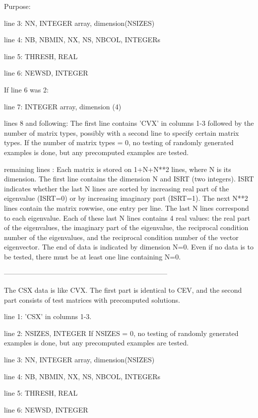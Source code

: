 \begin{DoxyParagraph}{Purpose\+: }
\begin{DoxyVerb}
 line 3:  NN, INTEGER array, dimension(NSIZES)

 line 4:  NB, NBMIN, NX, NS, NBCOL, INTEGERs

 line 5:  THRESH, REAL

 line 6:  NEWSD, INTEGER

 If line 6 was 2:

 line 7:  INTEGER array, dimension (4)

 lines 8 and following: The first line contains 'CVX' in columns 1-3
          followed by the number of matrix types, possibly with
          a second line to specify certain matrix types.
          If the number of matrix types = 0, no testing of randomly
          generated examples is done, but any precomputed examples
          are tested.

 remaining lines : Each matrix is stored on 1+N+N**2 lines, where N is
          its dimension. The first line contains the dimension N and
          ISRT (two integers). ISRT indicates whether the last N lines
          are sorted by increasing real part of the eigenvalue
          (ISRT=0) or by increasing imaginary part (ISRT=1). The next
          N**2 lines contain the matrix rowwise, one entry per line.
          The last N lines correspond to each eigenvalue. Each of
          these last N lines contains 4 real values: the real part of
          the eigenvalues, the imaginary part of the eigenvalue, the
          reciprocal condition number of the eigenvalues, and the
          reciprocal condition number of the vector eigenvector. The
          end of data is indicated by dimension N=0. Even if no data
          is to be tested, there must be at least one line containing
          N=0.

-----------------------------------------------------------------------

 The CSX data is like CVX. The first part is identical to CEV, and the
 second part consists of test matrices with precomputed solutions.

 line 1:  'CSX' in columns 1-3.

 line 2:  NSIZES, INTEGER
          If NSIZES = 0, no testing of randomly generated examples
          is done, but any precomputed examples are tested.

 line 3:  NN, INTEGER array, dimension(NSIZES)

 line 4:  NB, NBMIN, NX, NS, NBCOL, INTEGERs

 line 5:  THRESH, REAL

 line 6:  NEWSD, INTEGER


\end{DoxyVerb}
\end{DoxyParagraph}
